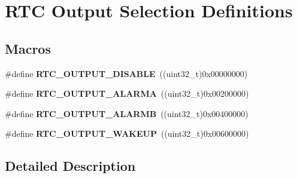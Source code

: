\hypertarget{group___r_t_c___output__selection___definitions}{}\section{R\+TC Output Selection Definitions}
\label{group___r_t_c___output__selection___definitions}
\subsection*{Macros}
\begin{DoxyCompactItemize}
\item 
\#define {\bfseries R\+T\+C\+\_\+\+O\+U\+T\+P\+U\+T\+\_\+\+D\+I\+S\+A\+B\+LE}~((uint32\+\_\+t)0x00000000)\hypertarget{group___r_t_c___output__selection___definitions_ga2c2347927c96e0db36e16d865a33a5e9}{}\label{group___r_t_c___output__selection___definitions_ga2c2347927c96e0db36e16d865a33a5e9}

\item 
\#define {\bfseries R\+T\+C\+\_\+\+O\+U\+T\+P\+U\+T\+\_\+\+A\+L\+A\+R\+MA}~((uint32\+\_\+t)0x00200000)\hypertarget{group___r_t_c___output__selection___definitions_gab5decd99536cc483960c47de13d2cdf1}{}\label{group___r_t_c___output__selection___definitions_gab5decd99536cc483960c47de13d2cdf1}

\item 
\#define {\bfseries R\+T\+C\+\_\+\+O\+U\+T\+P\+U\+T\+\_\+\+A\+L\+A\+R\+MB}~((uint32\+\_\+t)0x00400000)\hypertarget{group___r_t_c___output__selection___definitions_gad0ee3ae5e03aada25ee96ca797d94a9d}{}\label{group___r_t_c___output__selection___definitions_gad0ee3ae5e03aada25ee96ca797d94a9d}

\item 
\#define {\bfseries R\+T\+C\+\_\+\+O\+U\+T\+P\+U\+T\+\_\+\+W\+A\+K\+E\+UP}~((uint32\+\_\+t)0x00600000)\hypertarget{group___r_t_c___output__selection___definitions_gaa670c4221f0e1d6611bc477bfcb8b124}{}\label{group___r_t_c___output__selection___definitions_gaa670c4221f0e1d6611bc477bfcb8b124}

\end{DoxyCompactItemize}


\subsection{Detailed Description}

